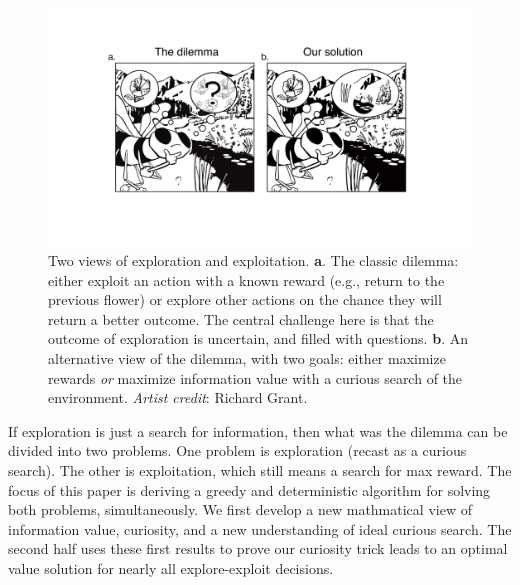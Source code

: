 \begin{figure}
	\begin{fullwidth}
	\includegraphics[width=.55\linewidth]{img/bee.pdf} 
	\caption{Two views of exploration and exploitation. \textbf{a}. The classic dilemma: either exploit an action with a known reward (e.g., return to the previous flower) or explore other actions on the chance they will return a better outcome. The central challenge here is that the outcome of exploration is uncertain, and filled with questions. \textbf{b}. An alternative view of the dilemma, with two goals: either maximize rewards \textit{or} maximize information value with a curious search of the environment. \textit{Artist credit}: Richard Grant.}
	\label{fig:bee} 
	\end{fullwidth}
\end{figure}

If exploration is just a search for information, then what was the dilemma can be divided into two problems. One problem is exploration (recast as a curious search). The other is exploitation, which still means a search for max reward. The focus of this paper is deriving a greedy and deterministic algorithm for solving both problems, simultaneously. We first develop a new mathmatical view of information value, curiosity, and a new understanding of ideal curious search. The second half uses these first results to prove our curiosity trick leads to an optimal value solution for nearly all explore-exploit decisions.


